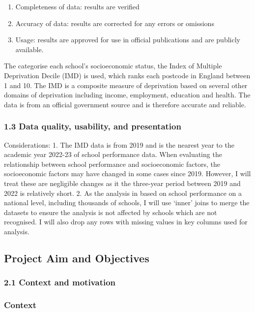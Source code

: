 \documentclass[
  letterpaper,
  DIV=11,
  numbers=noendperiod]{scrartcl}
\begin{document}
\begin{enumerate}
\def\labelenumi{\alph{enumi})}
\item
  Completeness of data: results are verified
\item
  Accuracy of data: results are corrected for any errors or omissions
\item
  Usage: results are approved for use in official publications and are
  publicly available.
\end{enumerate}

The categorise each school's socioeconomic status, the Index of Multiple
Deprivation Decile (IMD) is used, which ranks each postcode in England
between 1 and 10. The IMD is a composite measure of deprivation based on
several other domains of deprivation including income, employment,
education and health. The data is from an official government source and
is therefore accurate and reliable.

\subsubsection{1.3 Data quality, usability, and
presentation}\label{data-quality-usability-and-presentation}

Considerations: 1. The IMD data is from 2019 and is the nearest year to
the academic year 2022-23 of school performance data. When evaluating
the relationship between school performance and socioeconomic factors,
the socioeconomic factors may have changed in some cases since 2019.
However, I will treat these are negligible changes as it the three-year
period between 2019 and 2022 is relatively short. 2. As the analysis in
based on school performance on a national level, including thousands of
schools, I will use `inner' joins to merge the datasets to ensure the
analysis is not affected by schools which are not recognised. I will
also drop any rows with missing values in key columns used for analysis.

\subsection{Project Aim and
Objectives}\label{project-aim-and-objectives}

\subsubsection{2.1 Context and motivation}\label{context-and-motivation}

\subsubsection{Context}\label{context}
\end{document}
